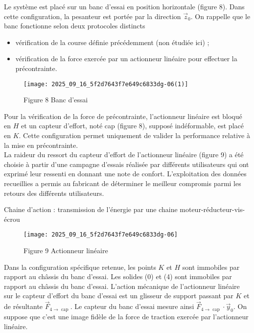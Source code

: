 Le système est placé sur un banc d'essai en position horizontale (figure 8). Dans cette configuration, la pesanteur est portée par la direction $\vec{z}_{0}$. On rappelle que le banc fonctionne selon deux protocoles distincts

\begin{itemize}
  \item vérification de la course définie précédemment (non étudiée ici) ;
  \item vérification de la force exercée par un actionneur linéaire pour effectuer la précontrainte.
\end{itemize}

\begin{figure}[h]
\begin{center}
  \texttt{[image: 2025\_09\_16\_5f2d7643f7e649c6833dg-06(1)]}
\captionsetup{labelformat=empty}
\caption{Figure 8 Banc d'essai}
\end{center}
\end{figure}

Pour la vérification de la force de précontrainte, l'actionneur linéaire est bloqué en $H$ et un capteur d'effort, noté cap (figure 8), supposé indéformable, est placé en $K$. Cette configuration permet uniquement de valider la performance relative à la mise en précontrainte.\\
La raideur du ressort du capteur d'effort de l'actionneur linéaire (figure 9) a été choisie à partir d'une campagne d'essais réalisée par différents utilisateurs qui ont exprimé leur ressenti en donnant une note de confort. L'exploitation des données recueillies a permis au fabricant de déterminer le meilleur compromis parmi les retours des différents utilisateurs.

Chaine d'action : transmission de l'énergie par une chaine moteur-réducteur-vis-écrou

\begin{figure}[h]
\begin{center}
  \texttt{[image: 2025\_09\_16\_5f2d7643f7e649c6833dg-06]}
\captionsetup{labelformat=empty}
\caption{Figure 9 Actionneur linéaire}
\end{center}
\end{figure}

Dans la configuration spécifique retenue, les points $K$ et $H$ sont immobiles par rapport au châssis du banc d'essai. Les solides (0) et (4) sont immobiles par rapport au châssis du banc d'essai. L'action mécanique de l'actionneur linéaire sur le capteur d'effort du banc d'essai est un glisseur de support passant par $K$ et de résultante $\vec{F}_{4 \rightarrow \text { cap }}$. Le capteur du banc d'essai mesure ainsi $\vec{F}_{4 \rightarrow \text { cap }} \cdot \vec{y}_{0}$. On suppose que c'est une image fidèle de la force de traction exercée par l'actionneur linéaire.

